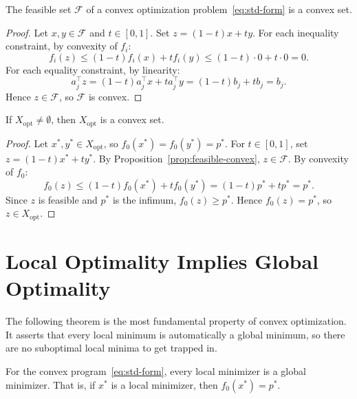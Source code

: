 \documentclass[11pt,a4paper]{article}
\begin{document}
\begin{proposition}\label{prop:feasible-convex}
The feasible set $\mathcal{F}$ of a convex optimization
problem~\eqref{eq:std-form} is a convex set.
\end{proposition}

\begin{proof}
Let $x, y \in \mathcal{F}$ and $t \in [0,1]$. Set $z = (1-t)x + ty$.
For each inequality constraint, by convexity of $f_i$:
\[
  f_i(z) \le (1-t) f_i(x) + t f_i(y) \le (1-t) \cdot 0 + t \cdot 0 = 0.
\]
For each equality constraint, by linearity:
\[
  a_j^\top z = (1-t) a_j^\top x + t a_j^\top y = (1-t) b_j + t b_j = b_j.
\]
Hence $z \in \mathcal{F}$, so $\mathcal{F}$ is convex.
\end{proof}

\begin{proposition}\label{prop:opt-set-convex}
If $X_{\text{opt}} \neq \emptyset$, then $X_{\text{opt}}$ is a convex set.
\end{proposition}

\begin{proof}
Let $x^*, y^* \in X_{\text{opt}}$, so $f_0(x^*) = f_0(y^*) = p^*$. For
$t \in [0,1]$, set $z = (1-t)x^* + ty^*$. By
Proposition~\ref{prop:feasible-convex}, $z \in \mathcal{F}$. By convexity
of $f_0$:
\[
  f_0(z) \le (1-t)f_0(x^*) + t f_0(y^*) = (1-t)p^* + t p^* = p^*.
\]
Since $z$ is feasible and $p^*$ is the infimum, $f_0(z) \ge p^*$. Hence
$f_0(z) = p^*$, so $z \in X_{\text{opt}}$.
\end{proof}


\section{Local Optimality Implies Global Optimality}\label{sec:local-global}

The following theorem is the most fundamental property of convex optimization.
It asserts that every local minimum is automatically a global minimum, so
there are no suboptimal local minima to get trapped in.

\begin{theorem}\label{thm:local-global}
For the convex program~\eqref{eq:std-form}, every local minimizer is a global
minimizer. That is, if $x^*$ is a local minimizer, then $f_0(x^*) = p^*$.
\end{theorem}
\end{document}

